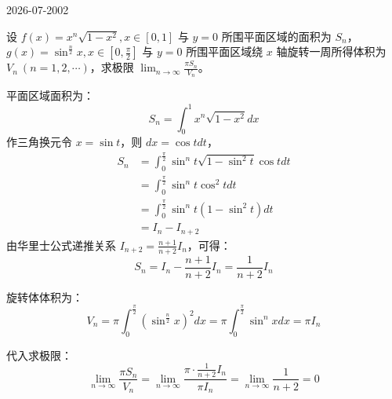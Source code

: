 \begin{mistake}{2026-07-20}{02}

\begin{problemcontent}
设 \(f(x) = x^n\sqrt{1-x^2}, x \in [0,1]\) 与 \(y=0\) 所围平面区域的面积为 \(S_n\)，\(g(x) = \sin^{\frac{n}{2}} x, x \in \left[0, \frac{\pi}{2}\right]\) 与 \(y=0\) 所围平面区域绕 \(x\) 轴旋转一周所得体积为 \(V_n \ (n=1,2,\cdots)\)，求极限 \(\lim_{n \to \infty} \frac{\pi S_n}{V_n}\)。
\end{problemcontent}

\begin{solutioncontent}
平面区域面积为：
\[ S_n = \int_0^1 x^n\sqrt{1-x^2} dx \]
作三角换元令 \(x = \sin t\)，则 \(dx = \cos t dt\)，
\[ \begin{aligned} 
S_n &= \int_0^{\frac{\pi}{2}} \sin^n t \sqrt{1-\sin^2 t} \cos t dt \\ 
&= \int_0^{\frac{\pi}{2}} \sin^n t \cos^2 t dt \\ 
&= \int_0^{\frac{\pi}{2}} \sin^n t (1-\sin^2 t) dt \\ 
&= I_n - I_{n+2} 
\end{aligned} \]
由华里士公式递推关系 \(I_{n+2} = \frac{n+1}{n+2}I_n\)，可得：
\[ S_n = I_n - \frac{n+1}{n+2}I_n = \frac{1}{n+2}I_n \]

旋转体体积为：
\[ V_n = \pi \int_0^{\frac{\pi}{2}} \left(\sin^{\frac{n}{2}} x\right)^2 dx = \pi \int_0^{\frac{\pi}{2}} \sin^n x dx = \pi I_n \]

代入求极限：
\[ \lim_{n \to \infty} \frac{\pi S_n}{V_n} = \lim_{n \to \infty} \frac{\pi \cdot \frac{1}{n+2}I_n}{\pi I_n} = \lim_{n \to \infty} \frac{1}{n+2} = 0 \]
\end{solutioncontent}


\end{mistake}
